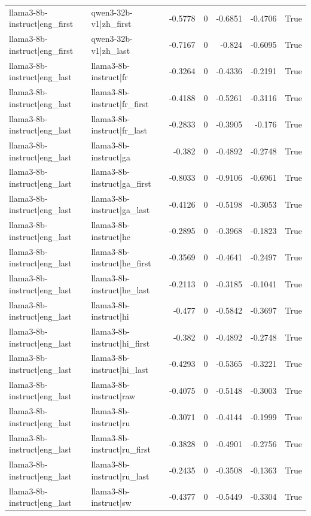 \begin{table}
\begin{tabular}{l l r r r r l}
llama3-8b-instruct|eng_first & qwen3-32b-v1|zh_first & -0.5778 & 0 & -0.6851 & -0.4706 & True \\
llama3-8b-instruct|eng_first & qwen3-32b-v1|zh_last & -0.7167 & 0 & -0.824 & -0.6095 & True \\
llama3-8b-instruct|eng_last & llama3-8b-instruct|fr & -0.3264 & 0 & -0.4336 & -0.2191 & True \\
llama3-8b-instruct|eng_last & llama3-8b-instruct|fr_first & -0.4188 & 0 & -0.5261 & -0.3116 & True \\
llama3-8b-instruct|eng_last & llama3-8b-instruct|fr_last & -0.2833 & 0 & -0.3905 & -0.176 & True \\
llama3-8b-instruct|eng_last & llama3-8b-instruct|ga & -0.382 & 0 & -0.4892 & -0.2748 & True \\
llama3-8b-instruct|eng_last & llama3-8b-instruct|ga_first & -0.8033 & 0 & -0.9106 & -0.6961 & True \\
llama3-8b-instruct|eng_last & llama3-8b-instruct|ga_last & -0.4126 & 0 & -0.5198 & -0.3053 & True \\
llama3-8b-instruct|eng_last & llama3-8b-instruct|he & -0.2895 & 0 & -0.3968 & -0.1823 & True \\
llama3-8b-instruct|eng_last & llama3-8b-instruct|he_first & -0.3569 & 0 & -0.4641 & -0.2497 & True \\
llama3-8b-instruct|eng_last & llama3-8b-instruct|he_last & -0.2113 & 0 & -0.3185 & -0.1041 & True \\
llama3-8b-instruct|eng_last & llama3-8b-instruct|hi & -0.477 & 0 & -0.5842 & -0.3697 & True \\
llama3-8b-instruct|eng_last & llama3-8b-instruct|hi_first & -0.382 & 0 & -0.4892 & -0.2748 & True \\
llama3-8b-instruct|eng_last & llama3-8b-instruct|hi_last & -0.4293 & 0 & -0.5365 & -0.3221 & True \\
llama3-8b-instruct|eng_last & llama3-8b-instruct|raw & -0.4075 & 0 & -0.5148 & -0.3003 & True \\
llama3-8b-instruct|eng_last & llama3-8b-instruct|ru & -0.3071 & 0 & -0.4144 & -0.1999 & True \\
llama3-8b-instruct|eng_last & llama3-8b-instruct|ru_first & -0.3828 & 0 & -0.4901 & -0.2756 & True \\
llama3-8b-instruct|eng_last & llama3-8b-instruct|ru_last & -0.2435 & 0 & -0.3508 & -0.1363 & True \\
llama3-8b-instruct|eng_last & llama3-8b-instruct|sw & -0.4377 & 0 & -0.5449 & -0.3304 & True \\

\end{tabular}
\end{table}
